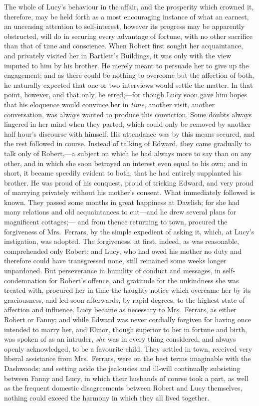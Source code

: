 The whole of Lucy's behaviour in the affair,
and the prosperity which crowned it, therefore, may be held
forth as a most encouraging instance of what an earnest,
an unceasing attention to self-interest, however its progress
may be apparently obstructed, will do in securing every
advantage of fortune, with no other sacrifice than that of time
and conscience.  When Robert first sought her acquaintance,
and privately visited her in Bartlett's Buildings,
it was only with the view imputed to him by his brother.
He merely meant to persuade her to give up the engagement;
and as there could be nothing to overcome but the affection
of both, he naturally expected that one or two interviews
would settle the matter.  In that point, however,
and that only, he erred;---for though Lucy soon gave him
hopes that his eloquence would convince her in \emph{time},
another visit, another conversation, was always wanted
to produce this conviction.  Some doubts always lingered
in her mind when they parted, which could only be
removed by another half hour's discourse with himself.
His attendance was by this means secured, and the rest
followed in course.  Instead of talking of Edward,
they came gradually to talk only of Robert,---a subject
on which he had always more to say than on any other,
and in which she soon betrayed an interest even equal
to his own; and in short, it became speedily evident
to both, that he had entirely supplanted his brother.
He was proud of his conquest, proud of tricking Edward,
and very proud of marrying privately without his
mother's consent.  What immediately followed is known.
They passed some months in great happiness at Dawlish;
for she had many relations and old acquaintances to
cut---and he drew several plans for magnificent cottages;---%
and from thence returning to town, procured the forgiveness
of Mrs.\ Ferrars, by the simple expedient of asking it,
which, at Lucy's instigation, was adopted.  The forgiveness,
at first, indeed, as was reasonable, comprehended only Robert;
and Lucy, who had owed his mother no duty and therefore
could have transgressed none, still remained some weeks
longer unpardoned.  But perseverance in humility of conduct
and messages, in self-condemnation for Robert's offence,
and gratitude for the unkindness she was treated with,
procured her in time the haughty notice which overcame
her by its graciousness, and led soon afterwards, by rapid
degrees, to the highest state of affection and influence.
Lucy became as necessary to Mrs.\ Ferrars, as either Robert
or Fanny; and while Edward was never cordially forgiven
for having once intended to marry her, and Elinor,
though superior to her in fortune and birth, was spoken
of as an intruder, \emph{she} was in every thing considered,
and always openly acknowledged, to be a favourite child.
They settled in town, received very liberal assistance
from Mrs.\ Ferrars, were on the best terms imaginable
with the Dashwoods; and setting aside the jealousies
and ill-will continually subsisting between Fanny and Lucy,
in which their husbands of course took a part, as well
as the frequent domestic disagreements between Robert and
Lucy themselves, nothing could exceed the harmony in which
they all lived together.

